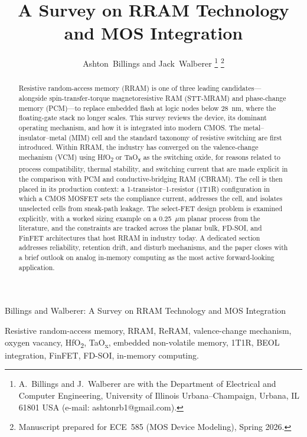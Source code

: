 \documentclass[lettersize,journal]{IEEEtran}
\begin{document}
\title{A Survey on RRAM Technology and MOS Integration}

\author{Ashton~Billings and Jack~Walberer%
\thanks{A.~Billings and J.~Walberer are with the Department of Electrical and Computer Engineering, University of Illinois Urbana--Champaign, Urbana, IL 61801 USA (e-mail: ashtonrb1@gmail.com).}%
\thanks{Manuscript prepared for ECE~585 (MOS Device Modeling), Spring 2026.}}

%
{Billings and Walberer: A Survey on RRAM Technology and MOS Integration}

\maketitle

\begin{abstract}
Resistive random-access memory (RRAM) is one of three leading candidates---alongside spin-transfer-torque magnetoresistive RAM (STT-MRAM) and phase-change memory (PCM)---to replace embedded flash at logic nodes below 28~nm, where the floating-gate stack no longer scales. This survey reviews the device, its dominant operating mechanism, and how it is integrated into modern CMOS. The metal--insulator--metal (MIM) cell and the standard taxonomy of resistive switching are first introduced. Within RRAM, the industry has converged on the valence-change mechanism (VCM) using HfO\textsubscript{2} or TaO\textsubscript{x} as the switching oxide, for reasons related to process compatibility, thermal stability, and switching current that are made explicit in the comparison with PCM and conductive-bridging RAM (CBRAM). The cell is then placed in its production context: a 1-transistor--1-resistor (1T1R) configuration in which a CMOS MOSFET sets the compliance current, addresses the cell, and isolates unselected cells from sneak-path leakage. The select-FET design problem is examined explicitly, with a worked sizing example on a 0.25~$\mu$m planar process from the literature, and the constraints are tracked across the planar bulk, FD-SOI, and FinFET architectures that host RRAM in industry today. A dedicated section addresses reliability, retention drift, and disturb mechanisms, and the paper closes with a brief outlook on analog in-memory computing as the most active forward-looking application.
\end{abstract}

\begin{IEEEkeywords}
Resistive random-access memory, RRAM, ReRAM, valence-change mechanism, oxygen vacancy, HfO\textsubscript{2}, TaO\textsubscript{x}, embedded non-volatile memory, 1T1R, BEOL integration, FinFET, FD-SOI, in-memory computing.
\end{IEEEkeywords}
\end{document}

